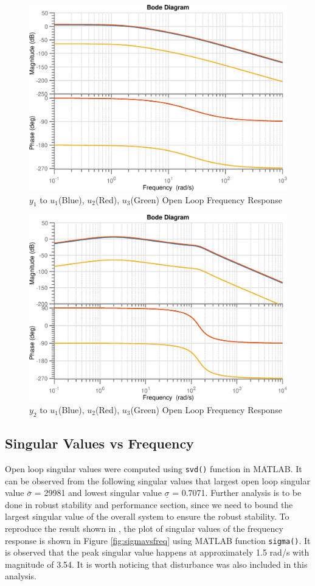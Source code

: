 \documentclass[12pt]{article}
\begin{document}
	\begin{figure}[H]
		\centering
		\includegraphics[width=0.8\linewidth]{bodeOpenLoop1}
		\caption{$y_1$ to $u_1$(Blue), $u_2$(Red), $u_3$(Green) Open Loop Frequency Response}
		\label{fig:bodeopenloop1}
	\end{figure}
	\begin{figure}[H]
		\centering
		\includegraphics[width=0.8\linewidth]{bodeOpenLoop2}
		\caption{$y_2$ to $u_1$(Blue), $u_2$(Red), $u_3$(Green) Open Loop Frequency Response}
		\label{fig:bodeopenloop2}
	\end{figure}
	
	\subsection{Singular Values vs Frequency}
	Open loop singular values were computed using \texttt{svd()} function in MATLAB. It can be observed from the following singular values that largest open loop singular value $\bar{\sigma}$ = 29981 and lowest singular value $\underline{\sigma}$ = 0.7071. Further analysis is to be done in robust stability and performance section, since we need to bound the largest singular value of the overall system to ensure the robust stability. To reproduce the result shown in \cite{cite1}, the plot of singular values of the frequency response is shown in Figure \ref{fig:sigmavsfreq} using MATLAB function \texttt{sigma()}. It is observed that the peak singular value happens at approximately 1.5 rad/s with magnitude of 3.54. It is worth noticing that disturbance was also included in this analysis.
	
\end{document}
